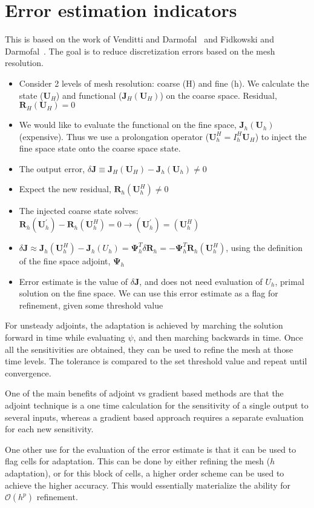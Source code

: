 \section{Error estimation indicators}
This is based on the work of Venditti and Darmofal~\cite{Venditti:2000} and Fidkowski and Darmofal~\cite{Fidkowski:2011}. The goal is to reduce discretization errors based on the mesh resolution.

\begin{itemize}
\item Consider 2 levels of mesh resolution: coarse (H) and fine (h). We calculate the state ($\mathbf{U}_H$) and functional ($\mathbf{J}_H(\mathbf{U}_H)$) on the coarse space. Residual, $\mathbf{R}_H(\mathbf{U}_H) = 0$
\item We would like to evaluate the functional on the fine space, $\mathbf{J}_h(\mathbf{U}_h)$ (expensive). Thus we use a prolongation operator ($\mathbf{U}_h^H = I_h^H \mathbf{U}_H$) to inject the fine space state onto the coarse space state.
\item The output error, $\delta \mathbf{J} \equiv \mathbf{J}_H(\mathbf{U}_H) - \mathbf{J}_h(\mathbf{U}_h) \neq 0$
\item Expect the new residual, $\mathbf{R}_h(\mathbf{U}_h^H) \neq 0$ 
\item The injected coarse state solves: $ \mathbf{R}_h(\mathbf{U}_h^\prime) - \mathbf{R}_h(\mathbf{U}_h^H) = 0 \rightarrow (\mathbf{U}_h^\prime) = (\mathbf{U}_h^H)$
\item $ \delta \mathbf{J} \approx  \mathbf{J}_h(\mathbf{U}_h^H) - \mathbf{J}_h(U_h) = \mathbf{\Psi}_h^T \delta \mathbf{R}_h = -\mathbf{\Psi}_h^T \mathbf{R}_h(\mathbf{U}_h^H)   $, using the definition of the fine space adjoint, $\mathbf{\Psi}_h$
\item Error estimate is the value of $\delta \mathbf{J}$, and does not need evaluation of $U_h$, primal solution on the fine space. We can use this error estimate as a flag for refinement, given some threshold value
\end{itemize}

For unsteady adjoints, the adaptation is achieved by marching the solution forward in time while evaluating $\psi$, and then marching backwards in time. Once all the sensitivities are obtained, they can be used to refine the mesh at those time levels. The tolerance is compared to the set threshold value and repeat until convergence.\par
One of the main benefits of adjoint vs gradient based methods are that the adjoint technique is a one time calculation for the sensitivity of a single output to several inputs, whereas a gradient based approach requires a separate evaluation for each new sensitivity. ~\cite{Giles:2000}

One other use for the evaluation of the error estimate is that it can be used to flag cells for adaptation. This can be done by either refining the mesh ($h$ adaptation), or for this block of cells, a higher order scheme can be used to achieve the higher accuracy. This would essentially materialize the ability for $\mathcal{O}(h^p)$ refinement.
